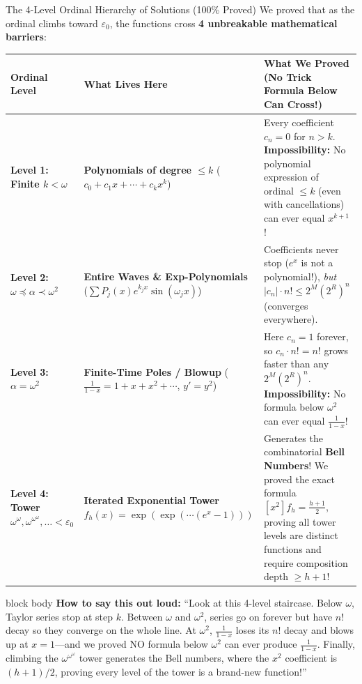 \documentclass[aspectratio=169,11pt]{beamer}
\newcommand{\say}[1]{%
  \vfill
  \begin{beamercolorbox}[sep=5pt,rounded=true,shadow=false]{block body}
  {\footnotesize \textbf{\textcolor{deepblue}{How to say this out loud:}} ``#1''}
  \end{beamercolorbox}
}
\begin{document}
\begin{frame}[shrink=10]{The 4-Level Ordinal Hierarchy of Solutions (100\% Proved)}
  We proved that as the ordinal climbs toward $\varepsilon_0$, the functions cross \textbf{4 unbreakable mathematical barriers}:

  \vspace{0.05cm}
  \footnotesize
  \begin{table}
    \centering
    \renewcommand{\arraystretch}{1.22}
    \begin{tabular}{>{\bfseries}p{2.6cm} p{4.2cm} p{6.2cm}}
      \toprule
      Ordinal Level & What Lives Here & What We Proved (No Trick Formula Below Can Cross!) \\
      \midrule
      Level 1: Finite $k < \omega$ & \textbf{Polynomials of degree $\le k$} ($c_0 + c_1 x + \cdots + c_k x^k$) & Every coefficient $c_n = 0$ for $n > k$. \textbf{Impossibility:} No polynomial expression of ordinal $\le k$ (even with cancellations) can ever equal $x^{k+1}$! \\
      Level 2: $\omega \preceq \alpha \prec \omega^2$ & \textbf{Entire Waves \& Exp-Polynomials} ($\sum P_j(x) e^{k_j x} \sin(\omega_j x)$) & Coefficients never stop ($e^x$ is not a polynomial!), \emph{but} $|c_n|\cdot n! \le 2^M(2^R)^n$ (converges everywhere). \\
      Level 3: $\alpha = \omega^2$ & \textbf{Finite-Time Poles / Blowup} ($\frac{1}{1-x} = 1 + x + x^2 + \cdots$, $y'=y^2$) & Here $c_n = 1$ forever, so $c_n \cdot n! = n!$ grows faster than any $2^M(2^R)^n$. \textbf{Impossibility:} \alert{No formula below $\omega^2$ can ever equal $\frac{1}{1-x}$!} \\
      Level 4: Tower $\omega^\omega, \omega^{\omega^\omega}, \dots < \varepsilon_0$ & \textbf{Iterated Exponential Tower} $f_h(x) = \exp(\exp(\cdots(e^x - 1)))$ & Generates the combinatorial \textbf{Bell Numbers}! We proved the exact formula $[x^2]f_h = \frac{h+1}{2}$, proving all tower levels are distinct functions and require composition depth $\ge h+1$! \\
      \bottomrule
    \end{tabular}
  \end{table}

  \say{Look at this 4-level staircase. Below $\omega$, Taylor series stop at step $k$. Between $\omega$ and $\omega^2$, series go on forever but have $n!$ decay so they converge on the whole line. At $\omega^2$, $\frac{1}{1-x}$ loses its $n!$ decay and blows up at $x=1$---and we proved NO formula below $\omega^2$ can ever produce $\frac{1}{1-x}$. Finally, climbing the $\omega^{\omega^{\omega}}$ tower generates the Bell numbers, where the $x^2$ coefficient is $(h+1)/2$, proving every level of the tower is a brand-new function!}
\end{frame}
\end{document}
